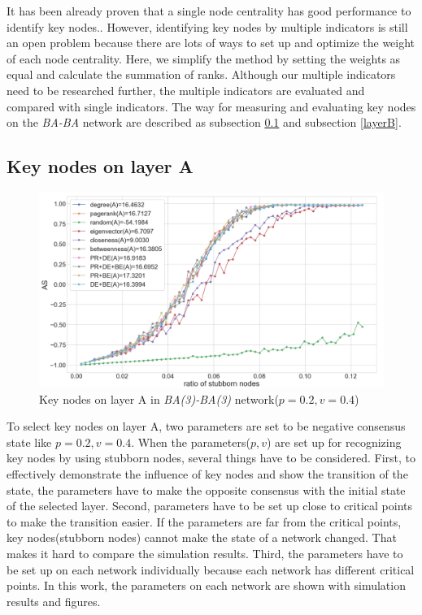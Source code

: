 It has been already proven that a single node centrality has good performance to identify key nodes.\parencite{koschutzki2008, francisco2018, bianconi2018}. However, identifying key nodes by multiple indicators is still an open problem because there are lots of ways to set up and optimize the weight of each node centrality.\parencite{huang2014}  Here, we simplify the method by setting the weights as equal and calculate the summation of ranks. Although our multiple indicators need to be researched further, the multiple indicators are evaluated and compared with single indicators. The way for measuring and evaluating key nodes on the \textit{BA-BA} network are described as subsection \ref{layerA} and subsection \ref{layerB}.\\
 
\subsection{Key nodes on layer A}
\label{layerA}
\begin{figure}[!htb]
	\centering
	\includegraphics[width=\hsize]{figure/chap5_keynode_A.png}
	\caption{Key nodes on layer A in \textit{BA(3)-BA(3)} network($p=0.2, v=0.4$)}
	\label{chap5_keynode_A}
\end{figure}
To select key nodes on layer A, two parameters are set to be negative consensus state like $p=0.2, v=0.4$. When the parameters($p, v$) are set up for recognizing key nodes by using stubborn nodes, several things have to be considered. First, to effectively demonstrate the influence of key nodes and show the transition of the state, the parameters have to make the opposite consensus with the initial state of the selected layer. Second, parameters have to be set up close to critical points to make the transition easier. If the parameters are far from the critical points, key nodes(stubborn nodes) cannot make the state of a network changed. That makes it hard to compare the simulation results. Third, the parameters have to be set up on each network individually because each network has different critical points.  In this work, the parameters on each network are shown with simulation results and figures.   

